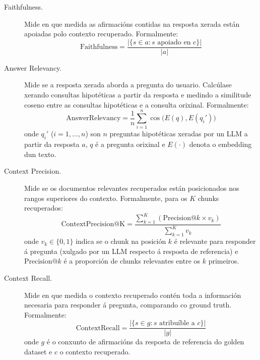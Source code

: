\documentclass[11pt, a4paper, oneside]{report}
\begin{document}
\begin{description}
  \item[Faithfulness.] Mide en que medida as afirmacións contidas na resposta xerada
    están apoiadas polo contexto recuperado. Formalmente:
    \begin{equation}
      \text{Faithfulness} = \frac{|\{s \in a : s \text{ apoiado en } c\}|}{|a|}
      \label{eq:faithfulness}
    \end{equation}

  \item[Answer Relevancy.] Mide se a resposta xerada aborda a pregunta do usuario.
    Calcúlase xerando consultas hipotéticas a partir da resposta e medindo a
    similitude coseno entre as consultas hipotéticas e a consulta orixinal. Formalmente:
    \begin{equation}
      \text{AnswerRelevancy} = \frac{1}{n}\sum_{i=1}^{n} \cos\big(E(q), E(q_i')\big)
      \label{eq:answer_relevancy}
    \end{equation}
    onde $q_i'$ ($i = 1, \dots, n$) son $n$ preguntas hipotéticas xeradas por un LLM a
    partir da resposta $a$, $q$ é a pregunta orixinal e $E(\cdot)$ denota o embedding
    dun texto.

  \item[Context Precision.] Mide se os documentos relevantes recuperados están
    posicionados nos rangos superiores do contexto. Formalmente, para os $K$ chunks
    recuperados:
    \begin{equation}
      \text{ContextPrecision@K} = \frac{\sum_{k=1}^{K} \left(\text{Precision@}k \times v_k\right)}{\sum_{k=1}^{K} v_k}
      \label{eq:context_precision}
    \end{equation}
    onde $v_k \in \{0, 1\}$ indica se o chunk na posición $k$ é relevante para responder
    á pregunta (xulgado por un LLM respecto á resposta de referencia) e
    $\text{Precision@}k$ é a proporción de chunks relevantes entre os $k$ primeiros.

  \item[Context Recall.] Mide en que medida o contexto recuperado contén toda a
    información necesaria para responder á pregunta, comparando co ground truth.
    Formalmente:
    \begin{equation}
      \text{ContextRecall} = \frac{|\{s \in g : s \text{ atribuíble a } c\}|}{|g|}
      \label{eq:context_recall}
    \end{equation}
    onde $g$ é o conxunto de afirmacións da resposta de referencia do golden dataset e
    $c$ o contexto recuperado.


\end{description}
\end{document}
